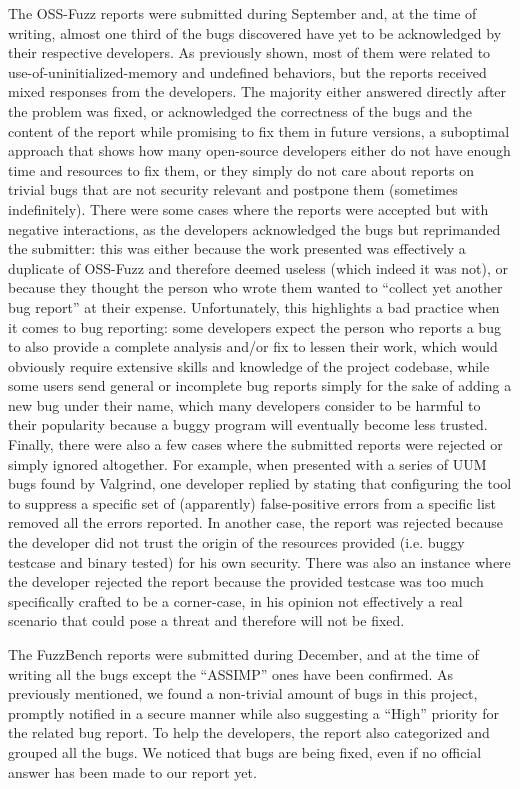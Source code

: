 The OSS-Fuzz reports were submitted during September and, at the time of writing, almost one third of the bugs discovered have yet to be acknowledged by their respective developers. 
As previously shown, most of them were related to use-of-uninitialized-memory and undefined behaviors, but the reports received mixed responses from the developers. The majority either answered directly after the problem was fixed, or acknowledged the correctness of the bugs and the content of the report while promising to fix them in future versions, a suboptimal approach that shows how many open-source developers either do not have enough time and resources to fix them, or they simply do not care about reports on trivial bugs that are not security relevant and postpone them (sometimes indefinitely). 
There were some cases where the reports were accepted but with negative interactions, as the developers acknowledged the bugs but reprimanded the submitter: this was either because the work presented was effectively a duplicate of OSS-Fuzz and therefore deemed useless (which indeed it was not), or because they thought the person who wrote them wanted to ``collect yet another bug report'' at their expense. Unfortunately, this highlights a bad practice when it comes to bug reporting: some developers expect the person who reports a bug to also provide a complete analysis and/or fix to lessen their work, which would obviously require extensive skills and knowledge of the project codebase, while some users send general or incomplete bug reports simply for the sake of adding a new bug under their name, which many developers consider to be harmful to their popularity because a buggy program will eventually become less trusted.
Finally, there were also a few cases where the submitted reports were rejected or simply ignored altogether. For example, when presented with a series of UUM bugs found by Valgrind, one developer replied by stating that configuring the tool to suppress a specific set of (apparently) false-positive errors from a specific list removed all the errors reported. In another case, the report was rejected because the developer did not trust the origin of the resources provided (i.e. buggy testcase and binary tested) for his own security. There was also an instance where the developer rejected the report because the provided testcase was too much specifically crafted to be a corner-case, in his opinion not effectively a real scenario that could pose a threat and therefore will not be fixed.  

The FuzzBench reports were submitted during December, and at the time of writing all the bugs except the ``ASSIMP'' ones have been confirmed. As previously mentioned, we found a non-trivial amount of bugs in this project, promptly notified in a secure manner while also suggesting a ``High'' priority for the related bug report. To help the developers, the report also categorized and grouped all the bugs. We noticed that bugs are being fixed, even if no official answer has been made to our report yet.


